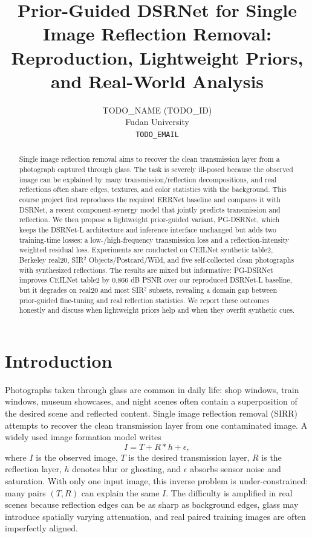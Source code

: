 \documentclass[10pt,twocolumn,letterpaper]{article}
\title{Prior-Guided DSRNet for Single Image Reflection Removal:\\
Reproduction, Lightweight Priors, and Real-World Analysis}
\author{TODO\_NAME (TODO\_ID)\\
Fudan University\\
{\tt\small TODO\_EMAIL}
}
\newcommand{\method}{PG-DSRNet\xspace}
\begin{document}
\maketitle

\begin{abstract}
Single image reflection removal aims to recover the clean transmission layer from a photograph captured through glass.
The task is severely ill-posed because the observed image can be explained by many transmission/reflection decompositions, and real reflections often share edges, textures, and color statistics with the background.
This course project first reproduces the required ERRNet baseline and compares it with DSRNet, a recent component-synergy model that jointly predicts transmission and reflection.
We then propose a lightweight prior-guided variant, \method, which keeps the DSRNet-L architecture and inference interface unchanged but adds two training-time losses: a low-/high-frequency transmission loss and a reflection-intensity weighted residual loss.
Experiments are conducted on CEILNet synthetic table2, Berkeley real20, SIR$^2$ Objects/Postcard/Wild, and five self-collected clean photographs with synthesized reflections.
The results are mixed but informative: \method improves CEILNet table2 by 0.866 dB PSNR over our reproduced DSRNet-L baseline, but it degrades on real20 and most SIR$^2$ subsets, revealing a domain gap between prior-guided fine-tuning and real reflection statistics.
We report these outcomes honestly and discuss when lightweight priors help and when they overfit synthetic cues.
\end{abstract}

\section{Introduction}

Photographs taken through glass are common in daily life: shop windows, train windows, museum showcases, and night scenes often contain a superposition of the desired scene and reflected content.
Single image reflection removal (SIRR) attempts to recover the clean transmission layer from one contaminated image.
A widely used image formation model writes
\begin{equation}
    I = T + R * h + \epsilon,
    \label{eq:image_formation}
\end{equation}
where $I$ is the observed image, $T$ is the desired transmission layer, $R$ is the reflection layer, $h$ denotes blur or ghosting, and $\epsilon$ absorbs sensor noise and saturation.
With only one input image, this inverse problem is under-constrained: many pairs $(T,R)$ can explain the same $I$.
The difficulty is amplified in real scenes because reflection edges can be as sharp as background edges, glass may introduce spatially varying attenuation, and real paired training images are often imperfectly aligned.
\end{document}
